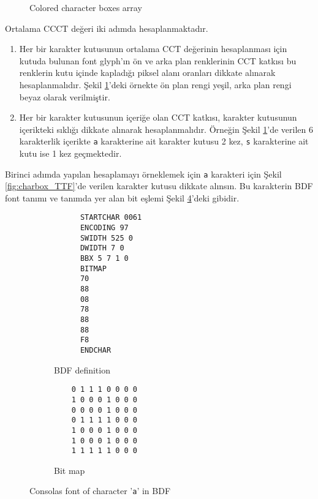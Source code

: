 \documentclass{article}
\begin{document}
\begin{figure}[H]
  \centering
  
  \caption{Colored character boxes array}
  \label{fig:line_of_charboxes}
\end{figure}

Ortalama CCCT değeri iki adımda hesaplanmaktadır.

\begin{enumerate}
  \item Her bir karakter kutusunun ortalama CCT değerinin hesaplanması için kutuda bulunan font glyph'ın ön ve arka plan
    renklerinin CCT katkısı bu renklerin kutu içinde kapladığı piksel alanı oranları dikkate alınarak hesaplanmalıdır.
    Şekil \ref{fig:line_of_charboxes}'deki örnekte ön plan rengi yeşil, arka plan rengi beyaz olarak verilmiştir.

  \item Her bir karakter kutusunun içeriğe olan CCT katkısı, karakter kutusunun içerikteki sıklığı dikkate alınarak
    hesaplanmalıdır.  Örneğin Şekil \ref{fig:line_of_charboxes}'de verilen 6 karakterlik içerikte \texttt{a} karakterine
    ait karakter kutusu 2 kez, \texttt{s} karakterine ait kutu ise 1 kez geçmektedir.
\end{enumerate}

Birinci adımda yapılan hesaplamayı örneklemek için \texttt{a} karakteri için Şekil \ref{fig:charbox_TTF}'de verilen
karakter kutusu dikkate alınsın.  Bu karakterin BDF font tanımı ve tanımda yer alan bit eşlemi Şekil
\ref{fig:letter_a_BDF}'deki gibidir.

\begin{figure}[htbp]
  \begin{subfigure}{0.48\textwidth}
    \centering
    \begin{BVerbatim}
      STARTCHAR 0061
      ENCODING 97
      SWIDTH 525 0
      DWIDTH 7 0
      BBX 5 7 1 0
      BITMAP
      70
      88
      08
      78
      88
      88
      F8
      ENDCHAR
    \end{BVerbatim}
    \caption{BDF definition}
    \label{code:letter_a_BDF_definitiion}
  \end{subfigure}
  \begin{subfigure}{0.48\textwidth}
    \centering
    \begin{BVerbatim}
    0 1 1 1 0 0 0 0
    1 0 0 0 1 0 0 0
    0 0 0 0 1 0 0 0
    0 1 1 1 1 0 0 0
    1 0 0 0 1 0 0 0
    1 0 0 0 1 0 0 0
    1 1 1 1 1 0 0 0
    \end{BVerbatim}
    \caption{Bit map}
    \label{fig:letter_a_BDF_bitmap}
  \end{subfigure}

  \caption{Consolas font of character '\texttt{a}' in BDF}
  \label{fig:letter_a_BDF}
\end{figure}
\end{document}
